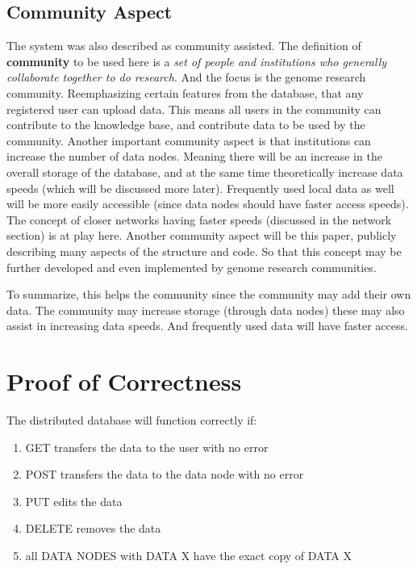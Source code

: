 \documentclass[acmsmall]{acmart}
\begin{document}
\begin{multicols}{2}
\subsection{Community Aspect} \label{community}
The system was also described as community assisted. The definition of \textbf{community} to be used here is a \textit{set of people and institutions who generally collaborate together to do research}. And the focus is the genome research community. Reemphasizing certain features from the database, that any registered user can upload data. This means all users in the community can contribute to the knowledge base, and contribute data to be used by the community. Another important community aspect is that institutions can increase the number of data nodes. Meaning there will be an increase in the overall storage of the database, and at the same time theoretically increase data speeds (which will be discussed more later). Frequently used local data as well will be more easily accessible (since data nodes should have faster access speeds). The concept of closer networks having faster speeds (discussed in the network section) is at play here. Another community aspect will be this paper, publicly describing many aspects of the structure and code. So that this concept may be further developed and even implemented by genome research communities.

To summarize, this helps the community since the community may add their own data. The community may increase storage (through data nodes) these may also assist in increasing data speeds. And frequently used data will have faster access. 



\section{Proof of Correctness}
The distributed database will function correctly if:

\begin{enumerate}
    \item GET transfers the data to the user with no error
    \item POST transfers the data to the data node with no error
    \item PUT edits the data
    \item DELETE removes the data
    \item all DATA NODES with DATA X have the exact copy of DATA X
\end{enumerate}



\end{multicols}
\end{document}
